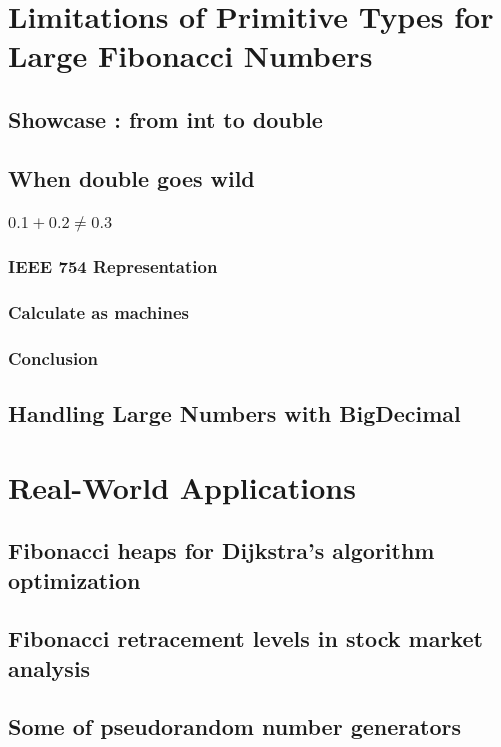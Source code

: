 \documentclass{article}
\begin{document}
\section{Limitations of Primitive Types for Large Fibonacci Numbers}
\subsection{Showcase : from int to double}
\subsection{When double goes wild}
\subsubsection{$0.1 + 0.2 \ne 0.3$}
\subsubsection{IEEE 754 Representation}
\subsubsection{Calculate as machines}
\subsubsection{Conclusion}
\subsection{Handling Large Numbers with BigDecimal}
\section{Real-World Applications}
\subsection{Fibonacci heaps for Dijkstra's algorithm optimization}
\subsection{Fibonacci retracement levels in stock market analysis}
\subsection{Some of pseudorandom number generators}
\end{document}
